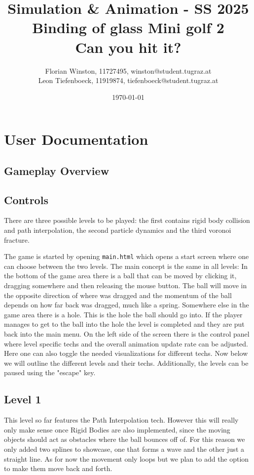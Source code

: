 \documentclass{article}
\title{	
	\large Simulation \& Animation - SS 2025\\
	\Huge{Binding of glass Mini golf 2}\\
	\huge{Can you hit it?}
}
\author{\parbox{\textwidth}{\centering
	Florian Winston, 11727495, winston@student.tugraz.at\\%
	Leon Tiefenboeck, 11919874, tiefenboeck@student.tugraz.at\\%
}}
\date{\today}
\begin{document}
\maketitle

\section{User Documentation}

\subsection{Gameplay Overview}

\subsection{Controls}

There are three possible levels to be played: the first contains rigid body collision and path interpolation, the second particle dynamics and the third voronoi fracture. 

The game is started by opening \texttt{main.html} which opens a 
start screen where one can choose between the two levels. 
The main concept is the same in all levels: 
In the bottom of the game area there is a ball that can be moved 
by clicking it, dragging somewhere and then releasing the mouse button. 
The ball will move in the opposite direction of where was dragged and the momentum of the 
ball depends on how far back was dragged, much like a spring. 
Somewhere else in the game area there is a hole. This is the hole 
the ball should go into. If the player manages to get to the ball into the hole the level is completed 
and they are put back into the main menu. 
On the left side of the screen there is the control panel where level specific techs 
and the overall animation update rate can be adjusted. Here one can also toggle the needed visualizations 
for different techs. Now below we will outline the different levels and their techs.
Additionally, the levels can be paused using the "escape" key.

\subsection{Level 1}

This level so far features the Path Interpolation tech. However this will really only make sense 
once Rigid Bodies are also implemented, since the moving objects should act as obstacles where the 
ball bounces off of. For this reason we only added two splines to showcase, one that forms a wave and the other
just a straight line. As for now the movement only loops but we plan to add the option to 
make them move back and forth. 
\end{document}
